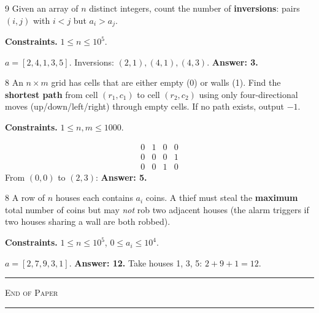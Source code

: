 \begin{problem}{9}
Given an array of $n$ distinct integers, count the number of
\textbf{inversions}: pairs $(i, j)$ with $i < j$ but $a_i > a_j$.

\smallskip\noindent\textbf{Constraints.} $1 \le n \le 10^5$.

\begin{example}
$a = [2, 4, 1, 3, 5]$. Inversions: $(2,1), (4,1), (4,3)$.
\textbf{Answer: 3.}
\end{example}
\task
\end{problem}

\begin{problem}{8}
An $n \times m$ grid has cells that are either empty (0) or walls (1).
Find the \textbf{shortest path} from cell $(r_1, c_1)$ to cell $(r_2, c_2)$
using only four-directional moves (up/down/left/right) through empty cells.
If no path exists, output $-1$.

\smallskip\noindent\textbf{Constraints.} $1 \le n, m \le 1000$.

\begin{example}
\[
\begin{array}{cccc}
0 & 1 & 0 & 0 \\
0 & 0 & 0 & 1 \\
0 & 0 & 1 & 0
\end{array}
\]
From $(0,0)$ to $(2,3)$: \textbf{Answer: 5.}
\end{example}
\task
\end{problem}

\begin{problem}{8}
A row of $n$ houses each contains $a_i$ coins. A thief must steal the
\textbf{maximum} total number of coins but may \emph{not} rob two adjacent
houses (the alarm triggers if two houses sharing a wall are both robbed).

\smallskip\noindent\textbf{Constraints.} $1 \le n \le 10^5$,
$0 \le a_i \le 10^4$.

\begin{example}
$a = [2, 7, 9, 3, 1]$. \textbf{Answer: 12.} Take houses 1, 3, 5:
$2 + 9 + 1 = 12$.
\end{example}
\task
\end{problem}

\begin{center}
\vspace{1em}
{\color{kiogreen}\rule{0.3\linewidth}{0.8pt}}\quad
\textsc{End of Paper}\quad
{\color{kiogreen}\rule{0.3\linewidth}{0.8pt}}
\end{center}

